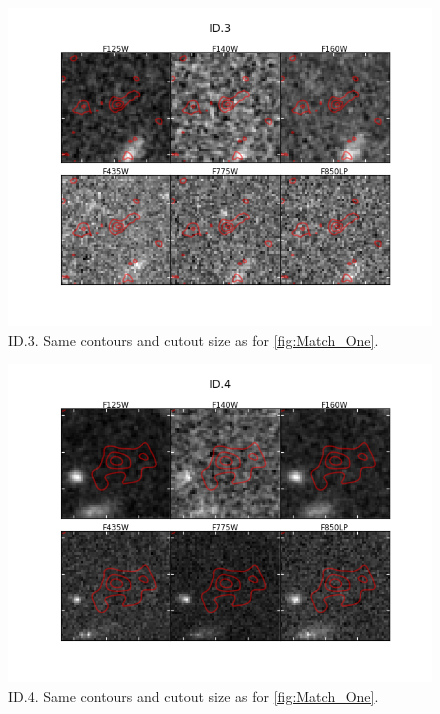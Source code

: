 \begin{figure}[tbp]
\centering \includegraphics[width=160mm]{Matched/ASPECS_Cutout_2.png}
\caption{ID.3. Same contours and cutout size as for \ref{fig:Match_One}.}
\label{fig:Match_Three}
\end{figure}

\begin{figure}[tbp]
\centering \includegraphics[width=160mm]{Matched/ASPECS_Cutout_3.png}
\caption{ID.4. Same contours and cutout size as for \ref{fig:Match_One}.}
\label{fig:Match_Three}
\end{figure}

